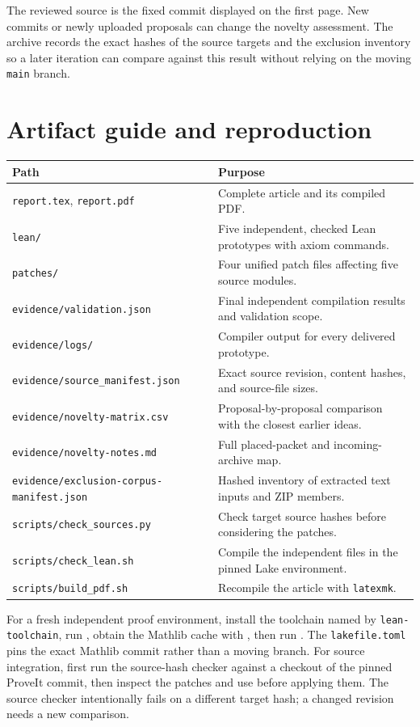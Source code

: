 \documentclass[11pt,letterpaper]{article}
\newcommand{\code}[1]{\nolinkurl{#1}}
\begin{document}
The reviewed source is the fixed commit displayed on the first page. New commits or newly uploaded proposals can change the novelty assessment. The archive records the exact hashes of the source targets and the exclusion inventory so a later iteration can compare against this result without relying on the moving \code{main} branch.

\section{Artifact guide and reproduction}

\begin{tabularx}{\linewidth}{@{}p{.30\linewidth}X@{}}
\toprule
Path & Purpose\\\midrule
\code{report.tex}, \code{report.pdf} & Complete article and its compiled PDF.\\
\code{lean/} & Five independent, checked Lean prototypes with axiom commands.\\
\code{patches/} & Four unified patch files affecting five source modules.\\
\code{evidence/validation.json} & Final independent compilation results and validation scope.\\
\code{evidence/logs/} & Compiler output for every delivered prototype.\\
\code{evidence/source_manifest.json} & Exact source revision, content hashes, and source-file sizes.\\
\code{evidence/novelty-matrix.csv} & Proposal-by-proposal comparison with the closest earlier ideas.\\
\code{evidence/novelty-notes.md} & Full placed-packet and incoming-archive map.\\
\code{evidence/exclusion-corpus-manifest.json} & Hashed inventory of extracted text inputs and ZIP members.\\
\code{scripts/check_sources.py} & Check target source hashes before considering the patches.\\
\code{scripts/check_lean.sh} & Compile the independent files in the pinned Lake environment.\\
\code{scripts/build_pdf.sh} & Recompile the article with \code{latexmk}.\\
\bottomrule
\end{tabularx}

For a fresh independent proof environment, install the toolchain named by
\code{lean-toolchain}, run \texttt{}, obtain the Mathlib cache with
\texttt{}, then run \texttt{}. The
\code{lakefile.toml} pins the exact Mathlib commit rather than a moving branch.
For source integration, first run the source-hash checker against a checkout
of the pinned ProveIt commit, then inspect the patches and use
\texttt{} before applying them. The source checker intentionally
fails on a different target hash; a changed revision needs a new comparison.
\end{document}
